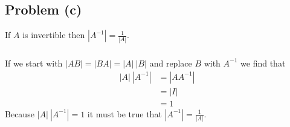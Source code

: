 \documentclass[11pt]{article}
\begin{document}
\subsection*{Problem (c)}
If $A$ is invertible then $|A^{-1}| = \frac{1}{|A|}$.
\subparagraph*{}
If we start with $|AB| = |BA| = |A|\ |B|$ and replace $B$ with $A^{-1}$ we find that 
\begin{align*}
	|A|\ |A^{-1}| &= |AA^{-1}| \\
	&= |I| \\
	&= 1
\end{align*}
Because $|A|\ |A^{-1}| = 1$ it must be true that $|A^{-1}| = \frac{1}{|A|}$. 
\end{document}
